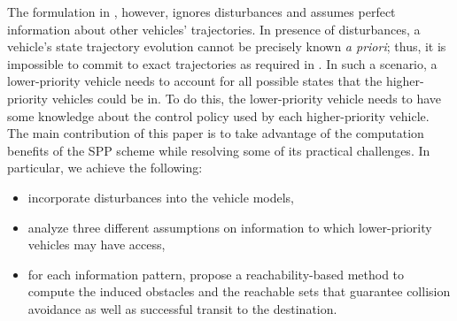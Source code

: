 The formulation in \cite{Chen15}, however, ignores disturbances and assumes perfect information about other vehicles' trajectories. In presence of disturbances, a vehicle's state trajectory evolution cannot be precisely known \textit{a priori}; thus, it is impossible to commit to exact trajectories as required in \cite{Chen15}. In such a scenario, a lower-priority vehicle needs to account for all possible states that the higher-priority vehicles could be in. To do this, the lower-priority vehicle needs to have some knowledge about the control policy used by each higher-priority vehicle. The main contribution of this paper is to take advantage of the computation benefits of the SPP scheme while resolving some of its practical challenges. In particular, we achieve the following:
\begin{itemize}
\item incorporate disturbances into the vehicle models,
\item analyze three different assumptions on information to which lower-priority vehicles may have access,
\item for each information pattern, propose a reachability-based method to compute the induced obstacles and the reachable sets that guarantee collision avoidance as well as successful transit to the destination.
\end{itemize}